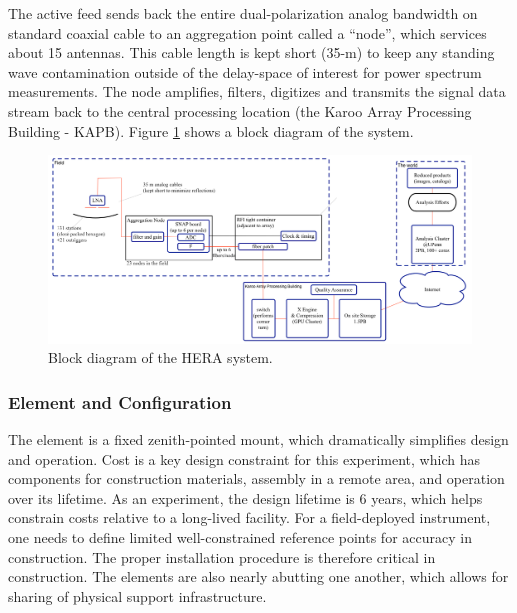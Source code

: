 \documentclass[preprint]{aastex}
\begin{document}
The active feed sends back the entire dual-polarization analog bandwidth on standard
coaxial cable to an aggregation point called a ``node'', which services 
about 15 antennas.  This cable length is kept short (35-m) to keep any standing
wave contamination outside of the delay-space of interest for power spectrum
measurements.  The node amplifies, filters, digitizes and transmits the signal data stream
back to the central processing location (the Karoo Array Processing Building - KAPB).
Figure \ref{fig:blockDiagram} shows a block diagram of the system.

\begin{figure}[h]
\centering
\includegraphics[width=\textwidth]{plots/Engineering/HERA_high_level_block_diagram.png}
\caption{Block diagram of the HERA system.}
\label{fig:blockDiagram} 
\end{figure}

\vspace{-0.25in}
\subsubsection{Element and Configuration}
\vspace{-6pt}


The element is a fixed zenith-pointed mount, which dramatically simplifies design and
operation. Cost is a key design constraint for this experiment, which has components
for construction materials, assembly in a remote area, and operation over its
lifetime. As an experiment, the design lifetime is 6 years, which helps constrain
costs relative to a long-lived facility. For a field-deployed instrument, one needs
to define limited well-constrained reference points for accuracy in construction. The
proper installation procedure is therefore critical in construction. The elements are
also nearly abutting one another, which allows for sharing of physical support
infrastructure.
\end{document}

